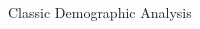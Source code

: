 \documentclass[10pt]{beamer}
\begin{document}
\begin{frame}[t]{Classic Demographic Analysis}
\begin{textblock*}{62mm}
{}


\end{textblock*}
\end{frame}
\end{document}
